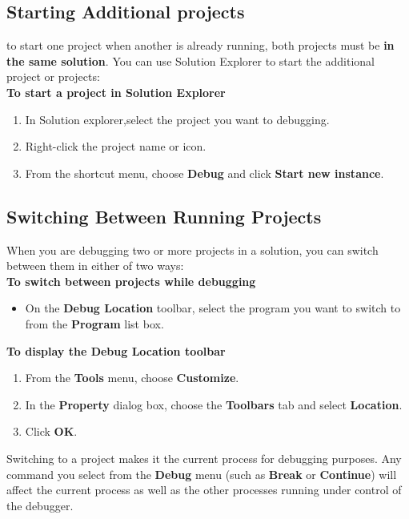 	\subsection{Starting Additional projects}
	to start one project when another is already running, both projects must be \textbf{in the same solution}. You can use Solution Explorer to start the additional project or projects:\\
	
	\textbf{To start a project in Solution Explorer}\\
	\begin{enumerate}
		\item In Solution explorer,select the project you want to debugging.
		\item Right-click the project name or icon.
		\item From the shortcut menu, choose \textbf{Debug} and click \textbf{Start new instance}.
	\end{enumerate}
	
	\subsection{Switching Between Running Projects}
	When you are debugging two or more projects in a solution, you can switch between them in either of two ways:\\
	
	\textbf{To switch between projects while debugging}
	\begin{itemize}
		\item On the \textbf{Debug Location} toolbar, select the program you want to switch to from the \textbf{Program} list box.
	\end{itemize}
	
	\textbf{To display the Debug Location toolbar}
	\begin{enumerate}
		\item From the \textbf{Tools} menu, choose \textbf{Customize}.
		\item In the \textbf{Property} dialog box, choose the \textbf{Toolbars} tab and select \textbf{Location}.
		\item Click \textbf{OK}.
	\end{enumerate}
	
	Switching to a project makes it the current process for debugging purposes. Any command you select from the \textbf{Debug} menu (such as \textbf{Break} or \textbf{Continue}) will affect the current process as well as the other processes running under control of the debugger.\\
	
